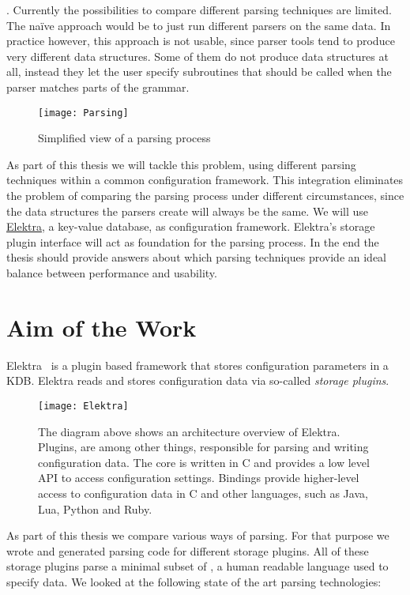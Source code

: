 . Currently the possibilities to compare different parsing techniques are limited. The naïve approach would be to just run different parsers on the same data. In practice however, this approach is not usable, since parser tools tend to produce very different data structures. Some of them do not produce data structures at all, instead they let the user specify subroutines that should be called when the parser matches parts of the grammar.

\begin{figure}[H]
  \centering
    \texttt{[image: Parsing]}
  \caption{Simplified view of a parsing process}
\end{figure}

As part of this thesis we will tackle this problem, using different parsing techniques within a common configuration framework. This integration eliminates the problem of comparing the parsing process under different circumstances, since the data structures the parsers create will always be the same. We will use \href{https://libelektra.org}{Elektra}, a key-value database, as configuration framework. Elektra’s storage plugin interface will act as foundation for the parsing process. In the end the thesis should provide answers about which parsing techniques provide an ideal balance between performance and usability.

\section{Aim of the Work}
\label{sec:aim_of_the_work}

Elektra~\cite{raab2010modular, raab2017context} is a plugin based framework that stores configuration parameters in a \gls{KDB}. Elektra reads and stores configuration data via so-called \emph{storage plugins}.

\begin{figure}[H]
  \centering
    \texttt{[image: Elektra]}
  \caption{The diagram above shows an architecture overview of Elektra. Plugins, are among other things, responsible for parsing and writing configuration data. The core is written in C and provides a low level \gls{API} to access configuration settings. Bindings provide higher-level access to configuration data in C and other languages, such as Java, Lua, Python and Ruby.}
\end{figure}

As part of this thesis we compare various ways of parsing. For that purpose we wrote and generated parsing code for different storage plugins. All of these storage plugins parse a minimal subset of , a human readable language used to specify data. We looked at the following state of the art parsing technologies:

